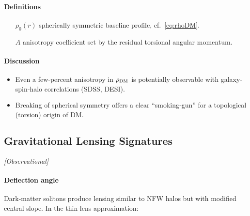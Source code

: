 \documentclass{article}
\newcommand{\obstag}{\textcolor{green!60!black}{\textit{[Observational]}}}
\begin{document}
\paragraph{Definitions}
\begin{itemize}[leftmargin=*]
  \item[$\rho_0(r)$] spherically symmetric baseline profile, cf.\ \eqref{eq:rhoDM}.
  \item[$A$] anisotropy coefficient set by the residual torsional angular momentum.
\end{itemize}

\paragraph{Discussion}
\begin{itemize}
  \item Even a few‐percent anisotropy in $\rho_{\rm DM}$ is potentially observable with galaxy‐spin‐halo correlations (SDSS, DESI).  
  \item Breaking of spherical symmetry offers a clear “smoking‐gun” for a topological (torsion) origin of DM.
\end{itemize}

\medskip
\begin{center}
\end{center}
\medskip


\subsection{Gravitational Lensing Signatures}
\label{sec:lensing}
\obstag


\paragraph{Deflection angle}
Dark‐matter solitons produce lensing similar to NFW halos but with modified central slope.  In the thin‐lens approximation:
\end{document}
